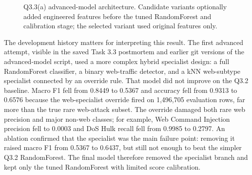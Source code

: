 \documentclass[journal,onecolumn]{IEEEtran}
\begin{document}
\begin{figure}[H]
\centering
{}
\caption{Q3.3(a) advanced-model architecture. Candidate variants optionally added engineered features before the tuned RandomForest and calibration stage; the selected variant used original features only.}
\label{fig:q3_arch}
\end{figure}

The development history matters for interpreting this result. The first advanced attempt, visible in the saved Task 3.3 postmortem and earlier git versions of the advanced-model script, used a more complex hybrid specialist design: a full RandomForest classifier, a binary web-traffic detector, and a kNN web-subtype specialist connected by an override rule. That model did not improve on the Q3.2 baseline. Macro F1 fell from 0.8449 to 0.5367 and accuracy fell from 0.9313 to 0.6576 because the web-specialist override fired on 1,496,705 evaluation rows, far more than the true rare web-attack subset. The override damaged both rare web precision and major non-web classes; for example, Web Command Injection precision fell to 0.0003 and DoS Hulk recall fell from 0.9985 to 0.2797. An ablation confirmed that the specialist was the main failure point: removing it raised macro F1 from 0.5367 to 0.6437, but still not enough to beat the simpler Q3.2 RandomForest. The final model therefore removed the specialist branch and kept only the tuned RandomForest with limited score calibration.
\end{document}
